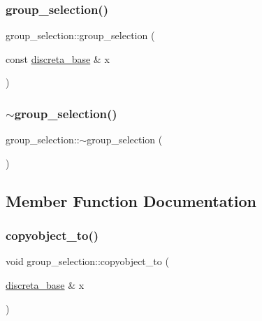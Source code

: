 \subsubsection{\texorpdfstring{group\+\_\+selection()}{group\_selection()}\hspace{0.1cm}{\footnotesize\ttfamily [2/2]}}
{\footnotesize\ttfamily group\+\_\+selection\+::group\+\_\+selection (\begin{DoxyParamCaption}\item[{const \mbox{\hyperlink{classdiscreta__base}{discreta\+\_\+base}} \&}]{x }\end{DoxyParamCaption})}

\mbox{\label{classgroup__selection_a3e5fde933dbf37ec41568956f3edf026}} 
\subsubsection{\texorpdfstring{$\sim$group\+\_\+selection()}{~group\_selection()}}
{\footnotesize\ttfamily group\+\_\+selection\+::$\sim$group\+\_\+selection (\begin{DoxyParamCaption}{ }\end{DoxyParamCaption})}



\subsection{Member Function Documentation}
\mbox{\label{classgroup__selection_a02a5e69978de662af0e8372a4f0b23a8}} 
\subsubsection{\texorpdfstring{copyobject\+\_\+to()}{copyobject\_to()}}
{\footnotesize\ttfamily void group\+\_\+selection\+::copyobject\+\_\+to (\begin{DoxyParamCaption}\item[{\mbox{\hyperlink{classdiscreta__base}{discreta\+\_\+base}} \&}]{x }\end{DoxyParamCaption})\hspace{0.3cm}{\ttfamily [virtual]}}




